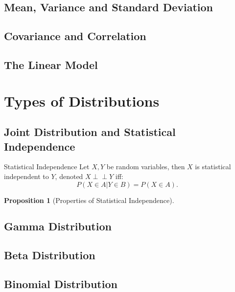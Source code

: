 \documentclass[11pt]{article}
\makeatletter
\newenvironment{definition}[1]{\begin{defbox}{#1}{}}{\end{defbox}}
\theoremstyle{quiet}
\newtheorem{proposition}[tcb@cnt@defbox]{Proposition}
\theoremstyle{quietremark}
\newcommand{\1}{\mathbf{1}}            %
\makeatother
\begin{document}
\subsection{Mean, Variance and Standard Deviation}

\subsection{Covariance and Correlation}

\subsection{The Linear Model}

\newpage
\section{Types of Distributions}

\subsection{Joint Distribution and Statistical Independence}
\begin{definition}{Statistical Independence}
Let $X,Y$ be random variables, then $X$ is statistical independent to $Y$, denoted $X\perp\!\!\!\!\perp Y$ iff:
\[
P(X\in A|Y\in B)=P(X\in A).
\]
\end{definition}

\begin{proposition}[Properties of Statistical Independence]

\end{proposition}

\subsection{Gamma Distribution}

\subsection{Beta Distribution}

\subsection{Binomial Distribution}
\end{document}

